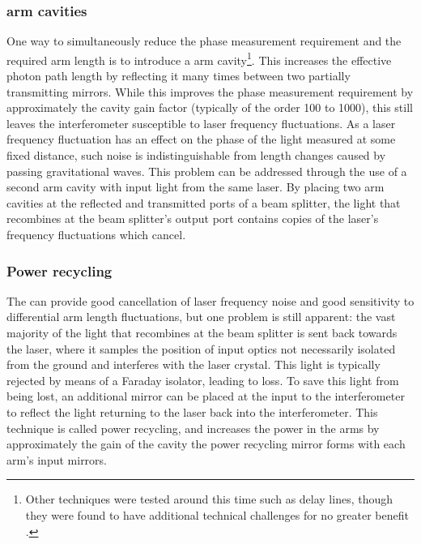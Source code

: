 
\subsubsection{\label{sec:fabry-perot-cavities}\FP{} arm cavities}
One way to simultaneously reduce the phase measurement requirement and the required arm length is to introduce a \FP{} arm cavity\footnote{Other techniques were tested around this time such as delay lines, though they were found to have additional technical challenges for no greater benefit .}. This increases the effective photon path length by reflecting it many times between two partially transmitting mirrors. While this improves the phase measurement requirement by approximately the cavity gain factor (typically of the order \num{100} to \num{1000}), this still leaves the interferometer susceptible to laser frequency fluctuations. As a laser frequency fluctuation has an effect on the phase of the light measured at some fixed distance, such noise is indistinguishable from length changes caused by passing gravitational waves. This problem can be addressed through the use of a second \FP{} arm cavity with input light from the same laser. By placing two arm cavities at the reflected and transmitted ports of a beam splitter, the light that recombines at the beam splitter's output port contains  copies of the laser's frequency fluctuations which cancel.

\subsubsection{Power recycling}
The \FPMI{} can provide good cancellation of laser frequency noise and good sensitivity to differential arm length fluctuations, but one problem is still apparent: the vast majority of the light that recombines at the beam splitter is sent back towards the laser, where it samples the position of input optics not necessarily isolated from the ground and interferes with the laser crystal. This light is typically rejected by means of a Faraday isolator, leading to loss. To save this light from being lost, an additional mirror can be placed at the input to the interferometer to reflect the light returning to the laser back into the interferometer. This technique is called power recycling, and increases the power in the arms by approximately the gain of the cavity the power recycling mirror forms with each arm's input mirrors.

